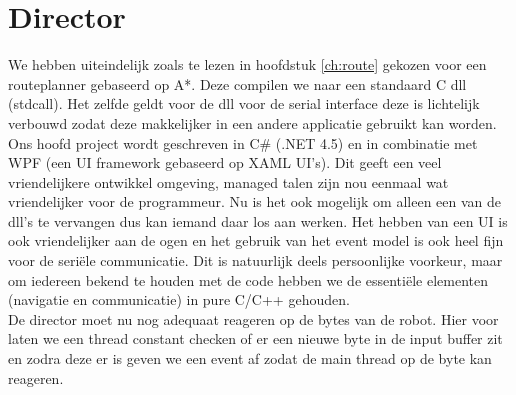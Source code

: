\documentclass{report}
\begin{document}
\section{Director}
We hebben uiteindelijk zoals te lezen in hoofdstuk \ref{ch:route} gekozen voor een routeplanner gebaseerd op A*. Deze compilen we naar een standaard C dll (stdcall). Het zelfde geldt voor de dll voor de serial interface deze is lichtelijk verbouwd zodat deze makkelijker in een andere applicatie gebruikt kan worden. Ons hoofd project wordt geschreven in C\# (.NET 4.5) en in combinatie met WPF (een UI framework gebaseerd op XAML UI's). Dit geeft een veel vriendelijkere ontwikkel omgeving, managed talen zijn nou eenmaal wat vriendelijker voor de programmeur. Nu is het ook mogelijk om alleen een van de dll's te vervangen dus kan iemand daar los aan werken. Het hebben van een UI is ook vriendelijker aan de ogen en het gebruik van het event model is ook heel fijn voor de seriële communicatie. Dit is natuurlijk deels persoonlijke voorkeur, maar om iedereen bekend te houden met de code hebben we de essentiële elementen (navigatie en communicatie) in pure C/C++ gehouden.\\
De director moet nu nog adequaat reageren op de bytes van de robot. Hier voor laten we een thread constant checken of er een nieuwe byte in de input buffer zit en zodra deze er is geven we een event af zodat de main thread op de byte kan reageren.
\end{document}
